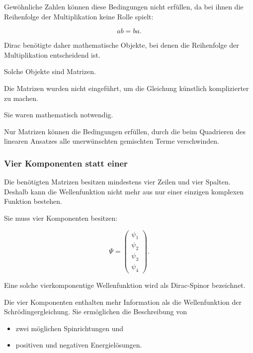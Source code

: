 Gewöhnliche Zahlen können diese Bedingungen nicht erfüllen, da bei
ihnen die Reihenfolge der Multiplikation keine Rolle spielt:

\begin{equation}
	ab
	=
	ba.
\end{equation}

Dirac benötigte daher mathematische Objekte, bei denen die Reihenfolge
der Multiplikation entscheidend ist.

Solche Objekte sind Matrizen.

\begin{DidacticBox}
	\label{box:warum_matrizen_weg_dirac}
	
	Die Matrizen wurden nicht eingeführt, um die Gleichung künstlich
	komplizierter zu machen.
	
	Sie waren mathematisch notwendig.
	
	Nur Matrizen können die Bedingungen erfüllen, durch die beim
	Quadrieren des linearen Ansatzes alle unerwünschten gemischten Terme
	verschwinden.
\end{DidacticBox}

\subsubsection*{Vier Komponenten statt einer}

Die benötigten Matrizen besitzen mindestens vier Zeilen und vier
Spalten. Deshalb kann die Wellenfunktion nicht mehr aus nur einer
einzigen komplexen Funktion bestehen.

Sie muss vier Komponenten besitzen:

\begin{equation}
	\Psi
	=
	\begin{pmatrix}
		\psi_1 \\
		\psi_2 \\
		\psi_3 \\
		\psi_4
	\end{pmatrix}.
	\label{eq:dirac_spinor_weg_dirac}
\end{equation}

Eine solche vierkomponentige Wellenfunktion wird als
Dirac-Spinor bezeichnet.

Die vier Komponenten enthalten mehr Information als die
Wellenfunktion der Schrödingergleichung. Sie ermöglichen die
Beschreibung von

\begin{itemize}
	\item zwei möglichen Spinrichtungen und
	\item positiven und negativen Energielösungen.
\end{itemize}

